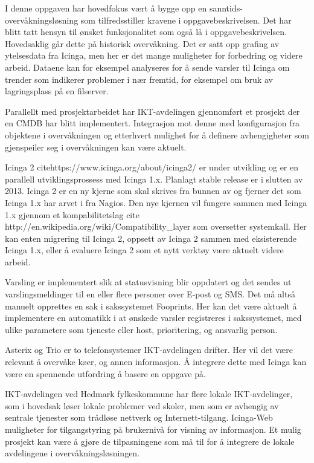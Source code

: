 I denne oppgaven har hovedfokus vært å bygge opp en sanntids-overvåkningsløsning som tilfredsstiller kravene i oppgavebeskrivelsen. Det har blitt tatt hensyn til ønsket funksjonalitet som også lå i oppgavebeskrivelsen. Hovedsaklig går dette på historisk overvåkning. Det er satt opp grafing av ytelsesdata fra Icinga, men her er det mange muligheter for forbedring og videre arbeid. Dataene kan for eksempel analyseres for å sende varsler til Icinga om trender som indikerer problemer i nær fremtid, for eksempel om bruk av lagringsplass på en filserver.

Parallellt med prosjektarbeidet har IKT-avdelingen gjennomført et prosjekt der en CMDB har blitt implementert. Integrasjon mot denne med konfigurasjon fra objektene i overvåkningen og etterhvert mulighet for å definere avhengigheter som gjenspeiler seg i overvåkningen kan være aktuelt.

Icinga 2 citehttps://www.icinga.org/about/icinga2/ er under utvikling og er en parallell utviklingsprossess med Icinga 1.x. Planlagt stable release er i slutten av 2013. Icinga 2 er en ny kjerne som skal skrives fra bunnen av og fjerner det som Icinga 1.x har arvet i fra Nagios. Den nye kjernen vil fungere sammen med Icinga 1.x gjennom et kompabilitetslag cite http://en.wikipedia.org/wiki/Compatibility\_layer som oversetter systemkall. Her kan enten migrering til Icinga 2, oppsett av Icinga 2 sammen med eksisterende Icinga 1.x, eller å evaluere Icinga 2 som et nytt verktøy være aktuelt videre arbeid. 

Varsling er implementert slik at statusvisning blir oppdatert og det sendes ut varslingsmeldinger til en eller flere personer over E-post og SMS. Det må altså manuelt opprettes en sak i sakssystemet Fooprints. Her kan det være aktuelt å implementere en automatikk i at ønskede varsler registreres i sakssystemet, med ulike parametere som tjeneste eller host, prioritering, og ansvarlig person.

Asterix og Trio er to telefonsystemer IKT-avdelingen drifter. Her vil det være relevant å overvåke køer, og annen informasjon. Å integrere dette med Icinga kan være en spennende utfordring å basere en oppgave på.

IKT-avdelingen ved Hedmark fylkeskommune har flere lokale IKT-avdelinger, som i hovedsak løser lokale problemer ved skoler, men som er avhengig av sentrale tjenester som trådløse nettverk og Internett-tilgang. Icinga-Web muligheter for tilgangstyring på brukernivå for visning av informasjon. Et mulig prosjekt kan være å gjøre de tilpasningene som må til for å integrere de lokale avdelingene i overvåkningsløsningen. 

